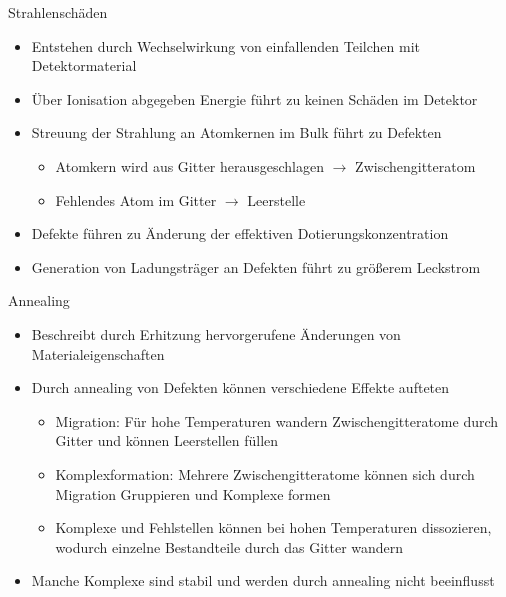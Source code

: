 \documentclass[aspectratio=1610, 9pt]{beamer}
\begin{document}
\begin{frame}{Strahlenschäden}
  \begin{itemize}
    \item Entstehen durch Wechselwirkung von einfallenden Teilchen mit Detektormaterial
    \medskip
    \item Über Ionisation abgegeben Energie führt zu keinen Schäden im Detektor
    \medskip
    \item Streuung der Strahlung an Atomkernen im Bulk führt zu Defekten
      \begin{itemize}
        \item Atomkern wird aus Gitter herausgeschlagen $\rightarrow$ Zwischengitteratom
        \item Fehlendes Atom im Gitter $\rightarrow$ Leerstelle
      \end{itemize}
    \medskip
    \item Defekte führen zu Änderung der effektiven Dotierungskonzentration
    \medskip
    \item Generation von Ladungsträger an Defekten führt zu größerem Leckstrom
  \end{itemize}
\end{frame}




\begin{frame}{Annealing}
  \begin{itemize}
    \item Beschreibt durch Erhitzung hervorgerufene Änderungen von Materialeigenschaften
    \medskip
    \item Durch annealing von Defekten können verschiedene Effekte aufteten
      \begin{itemize}
        \item Migration: Für hohe Temperaturen wandern Zwischengitteratome durch Gitter und
        können Leerstellen füllen
        \medskip
        \item Komplexformation: Mehrere Zwischengitteratome können sich durch Migration Gruppieren und Komplexe formen
        \medskip
        \item Komplexe und Fehlstellen können bei hohen Temperaturen dissozieren, wodurch einzelne Bestandteile durch das Gitter wandern
      \end{itemize}
    \medskip
    \item Manche Komplexe sind stabil und werden durch annealing nicht beeinflusst
  \end{itemize}
\end{frame}
\end{document}
